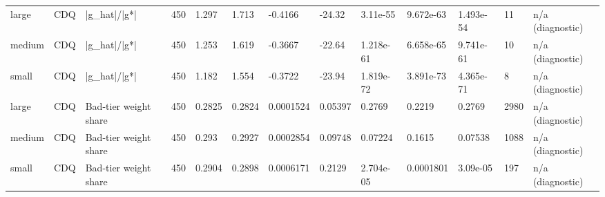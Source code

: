 \begin{table}[t]
\begin{tabular}{lllllllllllll}
large & CDQ & |g\_hat|/|g*| & 450 & 1.297 & 1.713 & -0.4166 & -24.32 & 3.11e-55 & 9.672e-63 & 1.493e-54 & 11 & n/a (diagnostic) \\
medium & CDQ & |g\_hat|/|g*| & 450 & 1.253 & 1.619 & -0.3667 & -22.64 & 1.218e-61 & 6.658e-65 & 9.741e-61 & 10 & n/a (diagnostic) \\
small & CDQ & |g\_hat|/|g*| & 450 & 1.182 & 1.554 & -0.3722 & -23.94 & 1.819e-72 & 3.891e-73 & 4.365e-71 & 8 & n/a (diagnostic) \\
large & CDQ & Bad-tier weight share & 450 & 0.2825 & 0.2824 & 0.0001524 & 0.05397 & 0.2769 & 0.2219 & 0.2769 & 2980 & n/a (diagnostic) \\
medium & CDQ & Bad-tier weight share & 450 & 0.293 & 0.2927 & 0.0002854 & 0.09748 & 0.07224 & 0.1615 & 0.07538 & 1088 & n/a (diagnostic) \\
small & CDQ & Bad-tier weight share & 450 & 0.2904 & 0.2898 & 0.0006171 & 0.2129 & 2.704e-05 & 0.0001801 & 3.09e-05 & 197 & n/a (diagnostic) \\
\bottomrule
\end{tabular}
\end{table}